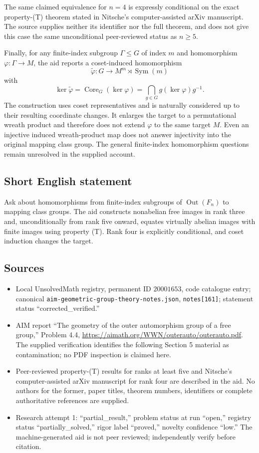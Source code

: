 \documentclass[11pt]{article}
\begin{document}
The same claimed equivalence for \(n=4\) is expressly conditional on the exact property-(T) theorem stated in Nitsche's computer-assisted arXiv manuscript. The source supplies neither its identifier nor the full theorem, and does not give this case the same unconditional peer-reviewed status as \(n\geq5\).

Finally, for any finite-index subgroup \(\Gamma\leq G\) of index \(m\) and homomorphism \(\varphi:\Gamma\to M\), the aid reports a coset-induced homomorphism
\[
 \widetilde\varphi:G\longrightarrow M^m\rtimes\operatorname{Sym}(m)
\]
with
\[
 \ker\widetilde\varphi
 =\operatorname{Core}_G(\ker\varphi)
 =\bigcap_{g\in G}g(\ker\varphi)g^{-1}.
\]
The construction uses coset representatives and is naturally considered up to their resulting coordinate changes. It enlarges the target to a permutational wreath product and therefore does not extend \(\varphi\) to the same target \(M\). Even an injective induced wreath-product map does not answer injectivity into the original mapping class group. The general finite-index homomorphism questions remain unresolved in the supplied account.
\subsection{Short English statement}
Ask about homomorphisms from finite-index subgroups of \(\operatorname{Out}(F_n)\) to mapping class groups. The aid constructs nonabelian free images in rank three and, unconditionally from rank five onward, equates virtually abelian images with finite images using property (T). Rank four is explicitly conditional, and coset induction changes the target.
\subsection{Sources}
\begin{itemize}
\item Local UnsolvedMath registry, permanent ID \(20001653\), code catalogue entry; canonical \texttt{aim-geometric-group-theory-notes.json}, \texttt{notes[161]}; statement status ``corrected\_verified.''
\item AIM report ``The geometry of the outer automorphism group of a free group,'' Problem 4.4, \url{https://aimath.org/WWN/outerauto/outerauto.pdf}. The supplied verification identifies the following Section 5 material as contamination; no PDF inspection is claimed here.
\item Peer-reviewed property-(T) results for ranks at least five and Nitsche's computer-assisted arXiv manuscript for rank four are described in the aid. No authors for the former, paper titles, theorem numbers, identifiers or complete authoritative references are supplied.
\item Research attempt 1: ``partial\_result,'' problem status at run ``open,'' registry status ``partially\_solved,'' rigor label ``proved,'' novelty confidence ``low.'' The machine-generated aid is not peer reviewed; independently verify before citation.
\end{itemize}
\end{document}
